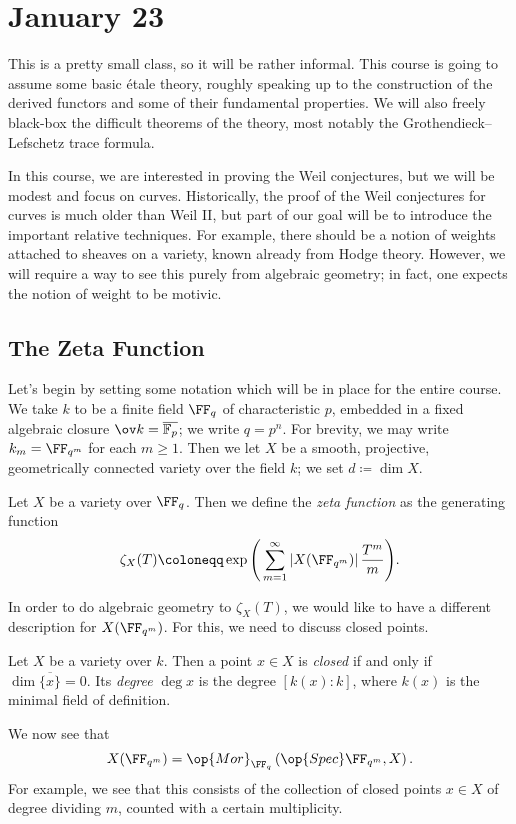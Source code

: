 \documentclass[../notes.tex]{subfiles}
\begin{document}
\section{January 23}

This is a pretty small class, so it will be rather informal. This course is going to assume some basic \'etale theory, roughly speaking up to the construction of the derived functors and some of their fundamental properties. We will also freely black-box the difficult theorems of the theory, most notably the Grothendieck--Lefschetz trace formula.

In this course, we are interested in proving the Weil conjectures, but we will be modest and focus on curves. Historically, the proof of the Weil conjectures for curves is much older than Weil II, but part of our goal will be to introduce the important relative techniques. For example, there should be a notion of weights attached to sheaves on a variety, known already from Hodge theory. However, we will require a way to see this purely from algebraic geometry; in fact, one expects the notion of weight to be motivic.

\subsection{The Zeta Function}
Let's begin by setting some notation which will be in place for the entire course. We take $k$ to be a finite field $\FF_q$ of characteristic $p$, embedded in a fixed algebraic closure $\ov k=\overline{\mathbb F_p}$; we write $q=p^n$. For brevity, we may write $k_m=\FF_{q^m}$ for each $m\ge1$. Then we let $X$ be a smooth, projective, geometrically connected variety over the field $k$; we set $d\coloneqq\dim X$.
\begin{definition}
	Let $X$ be a variety over $\FF_q$. Then we define the \textit{zeta function} as the generating function
	\[\zeta_X(T)\coloneqq\exp\Bigg(\sum_{m=1}^\infty\left|X(\FF_{q^m})\right|\frac{T^m}m\Bigg).\]
\end{definition}
In order to do algebraic geometry to $\zeta_X(T)$, we would like to have a different description for $X(\FF_{q^m})$. For this, we need to discuss closed points.
\begin{definition}
	Let $X$ be a variety over $k$. Then a point $x\in X$ is \textit{closed} if and only if $\dim\overline{\{x\}}=0$. Its \textit{degree} $\deg x$ is the degree $[k(x):k]$, where $k(x)$ is the minimal field of definition.
\end{definition}
We now see that
\[X(\FF_{q^m})=\op{Mor}_{\FF_q}\left(\op{Spec}\FF_{q^m},X\right).\]
For example, we see that this consists of the collection of closed points $x\in X$ of degree dividing $m$, counted with a certain multiplicity.
\end{document}
